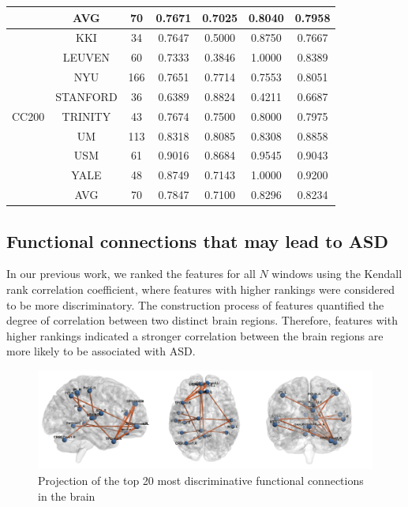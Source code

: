 \documentclass[journal,twoside,web]{ieeecolor}
\begin{document}
\begin{table}
\begin{tabular*}{\textwidth}{ccccccc}
		& AVG            & 70            & 0.7671            & 0.7025               & 0.8040               & 0.7958        \\ 
		\midrule
		\multirow{9}{*}{CC200}                & KKI            & 34            & 0.7647            & 0.5000               & 0.8750               & 0.7667        \\
		& LEUVEN         & 60            & 0.7333            & 0.3846               & 1.0000               & 0.8389        \\
		& NYU            & 166           & 0.7651            & 0.7714               & 0.7553               & 0.8051        \\
		& STANFORD       & 36            & 0.6389            & 0.8824               & 0.4211               & 0.6687        \\
		& TRINITY        & 43            & 0.7674            & 0.7500               & 0.8000               & 0.7975        \\
		& UM             & 113           & 0.8318            & 0.8085               & 0.8308               & 0.8858        \\
		& USM            & 61            & 0.9016            & 0.8684               & 0.9545               & 0.9043        \\
		& YALE           & 48            & 0.8749            & 0.7143               & 1.0000               & 0.9200        \\ 
		& AVG            & 70            & 0.7847            & 0.7100               & 0.8296               & 0.8234        \\
		\bottomrule
	\end{tabular*}
\end{table}

\subsection{Functional connections that may lead to ASD}
In our previous work, we ranked the features for all $N$ windows using the Kendall rank correlation coefficient, where features with higher rankings were considered to be more discriminatory. The construction process of features quantified the degree of correlation between two distinct brain regions. Therefore, features with higher rankings indicated a stronger correlation between the brain regions are more likely to be associated with ASD.

\begin{figure}[h]
	\centering
	\includegraphics[width=\textwidth]{imgs/brain4.png}
	\caption{Projection of the top 20 most discriminative functional connections in the brain}
	\label{fig4}
	
\end{figure} 
\end{document}
